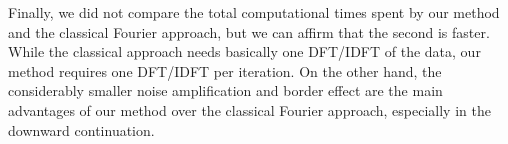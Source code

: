 Finally, we did not compare the total computational times spent by our method and the classical 
Fourier approach, but we can affirm that the second is faster. 
While the classical approach needs basically one DFT/IDFT of the data, 
our method requires one DFT/IDFT per iteration. 
On the other hand, the considerably smaller noise amplification and 
border effect are the main advantages of our method over the classical Fourier 
approach, especially in the downward continuation.

